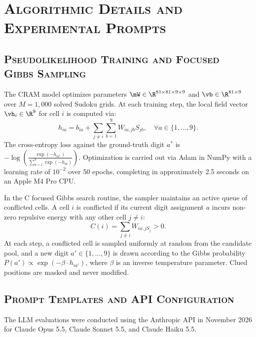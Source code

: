 \documentclass{article} %
\begin{document}



\appendix
\newpage
\section{\textsc{Algorithmic Details and Experimental Prompts}}
\label{sec:appendix_details}

\subsection{\textsc{Pseudolikelihood Training and Focused Gibbs Sampling}}
The CRAM model optimizes parameters $\mW \in \R^{81 \times 81 \times 9 \times 9}$ and $\vb \in \R^{81 \times 9}$ over $M = 1,000$ solved Sudoku grids. At each training step, the local field vector $\vh_i \in \R^9$ for cell $i$ is computed via:
\begin{equation}
    h_{ia} = b_{ia} + \sum_{j \neq i} \sum_{b=1}^9 W_{ia, jb} S_{jb}, \quad \forall a \in \{1, \dots, 9\}.
\end{equation}
The cross-entropy loss against the ground-truth digit $a^*$ is $-\log \left(\frac{\exp(-h_{ia^*})}{\sum_{a=1}^9 \exp(-h_{ia})}\right)$. Optimization is carried out via Adam in NumPy with a learning rate of $10^{-2}$ over 50 epochs, completing in approximately 2.5 seconds on an Apple M4 Pro CPU.

In the C focused Gibbs search routine, the sampler maintains an active queue of conflicted cells. A cell $i$ is conflicted if its current digit assignment $a$ incurs non-zero repulsive energy with any other cell $j \neq i$:
\begin{equation}
    C(i) = \sum_{j \neq i} W_{ia, j S_j} > 0.
\end{equation}
At each step, a conflicted cell is sampled uniformly at random from the candidate pool, and a new digit $a' \in \{1, \dots, 9\}$ is drawn according to the Gibbs probability $P(a') \propto \exp(-\beta \cdot h_{ia'})$, where $\beta$ is an inverse temperature parameter. Clued positions are masked and never modified.

\subsection{\textsc{Prompt Templates and API Configuration}}
The LLM evaluations were conducted using the Anthropic API in November 2026 for Claude Opus 5.5, Claude Sonnet 5.5, and Claude Haiku 5.5.
\end{document}
